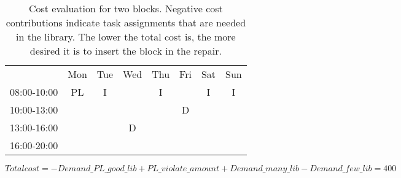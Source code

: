 \begin{table}[!h]
\centering
\caption{Cost evaluation for two blocks. Negative cost contributions indicate task assignments that are needed in the library. The lower the total cost is, the more desired it is to insert the block in the repair.}
\label{tab:block_costs}
\begin{tabular}{cccccccc}
                                 & Mon                                             & Tue                    & Wed                                            & Thu                    & Fri                                            & Sat                    & Sun                    \\ \cline{2-8} 
\multicolumn{1}{c|}{08:00-10:00} & \multicolumn{1}{c|}{\cellcolor[HTML]{FCFF2F}PL} & \multicolumn{1}{c|}{I} & \multicolumn{1}{c|}{} & \multicolumn{1}{c|}{I} & \multicolumn{1}{c|}{} & \multicolumn{1}{c|}{I} & \multicolumn{1}{c|}{I} \\ \cline{2-8} 
\multicolumn{1}{c|}{10:00-13:00} & \multicolumn{1}{c|}{\cellcolor[HTML]{FCFF2F}}   & \multicolumn{1}{c|}{}  & \multicolumn{1}{c|}{} & \multicolumn{1}{c|}{}  & \multicolumn{1}{c|}{\cellcolor[HTML]{FCFF2F}D} &     &   \\ \cline{2-6}
\multicolumn{1}{c|}{13:00-16:00} & \multicolumn{1}{c|}{\cellcolor[HTML]{FCFF2F}}   & \multicolumn{1}{c|}{}  & \multicolumn{1}{c|}{\cellcolor[HTML]{FCFF2F}D} & \multicolumn{1}{c|}{}  & \multicolumn{1}{c|}{}         &            &          \\ \cline{2-6}
\multicolumn{1}{c|}{16:00-20:00} & \multicolumn{1}{c|}{}  & \multicolumn{1}{c|}{}  & \multicolumn{1}{c|}{} & \multicolumn{1}{c|}{}  & \multicolumn{1}{c|}{} &         &         \\ \cline{2-6}
\end{tabular}
\newline
$Total cost = -Demand\_PL\_good\_lib + PL\_violate\_amount + Demand\_many\_lib - Demand\_few\_lib = 400$


\end{table}
